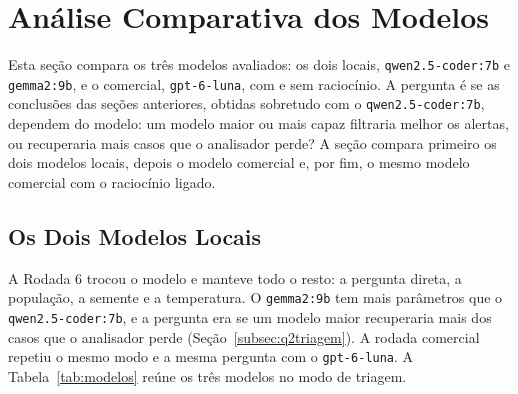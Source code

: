 \section{Análise Comparativa dos Modelos}
\label{sec:modelos}

Esta seção compara os três modelos avaliados: os dois locais, \texttt{qwen2.5-coder:7b} e \texttt{gemma2:9b}, e o comercial, \texttt{gpt-6-luna}, com e sem raciocínio. A pergunta é se as conclusões das seções anteriores, obtidas sobretudo com o \texttt{qwen2.5-coder:7b}, dependem do modelo: um modelo maior ou mais capaz filtraria melhor os alertas, ou recuperaria mais casos que o analisador perde? A seção compara primeiro os dois modelos locais, depois o modelo comercial e, por fim, o mesmo modelo comercial com o raciocínio ligado.

\subsection{Os Dois Modelos Locais}
\label{subsec:modeloslocais}

{\sloppy A Rodada 6 trocou o modelo e manteve todo o resto: a pergunta direta, a população, a semente e a temperatura. O \texttt{gemma2:9b} tem mais parâmetros que o \texttt{qwen2.5-coder:7b}, e a pergunta era se um modelo maior recuperaria mais dos casos que o analisador perde (Seção~\ref{subsec:q2triagem}). A rodada comercial repetiu o mesmo modo e a mesma pergunta com o \texttt{gpt-6-luna}. A Tabela~\ref{tab:modelos} reúne os três modelos no modo de triagem.\par}

